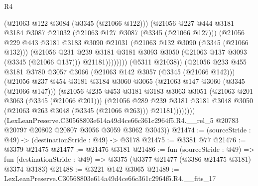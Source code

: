 \begin{lexlean}{R4}
\begin{coremodule}
                          (@21063 @122 @3084 (@3345 (@21066 @122)))
                          (@21056
                            @227
                            @444
                            @3181
                            @3184
                            @3087
                            @21032
                            (@21063 @127 @3087 (@3345 (@21066 @127)))
                            (@21056
                              @229
                              @443
                              @3181
                              @3183
                              @3090
                              @21031
                              (@21063 @132 @3090 (@3345 (@21066 @132)))
                              (@21056
                                @231
                                @239
                                @3181
                                @3181
                                @3093
                                @3050
                                (@21063 @137 @3093 (@3345 (@21066 @137)))
                                @21181))))))))
                (@5311 @21038))
              (@21056
                @233
                @455
                @3181
                @3780
                @3057
                @3066
                (@21063 @142 @3057 (@3345 (@21066 @142)))
                (@21056
                  @237
                  @454
                  @3181
                  @3184
                  @3060
                  @3065
                  (@21063 @147 @3060 (@3345 (@21066 @147)))
                  (@21056
                    @235
                    @453
                    @3181
                    @3183
                    @3063
                    @3051
                    (@21063 @201 @3063 (@3345 (@21066 @201)))
                    (@21056
                      @289
                      @239
                      @3181
                      @3181
                      @3048
                      @3050
                      (@21063 @263 @3048 (@3345 (@21066 @263)))
                      @21181))))))))
      (LexLeanPreserve.C30568803e614a49d4ce66c361c2964f5.R4.__rel_5
        @20783
        @20797
        @20802
        @20807
        @3056
        @3059
        @3062
        @3043))
@21474 := (sourceStride : @49) -> (destinationStride : @49) -> @3178
@21475 := @3381 @77
@21476 := @3379 @21475
@21477 := @21476 @3181
@21486 := fun (sourceStride : @49) =>
  fun (destinationStride : @49) => @3375 (@3377 @21477 (@3386 @21475 @3181) @3374 @3183)
@21488 := @3221 @142 @3065
@21489 := LexLeanPreserve.C30568803e614a49d4ce66c361c2964f5.R4.__fits_17

\end{coremodule}
\end{lexlean}
